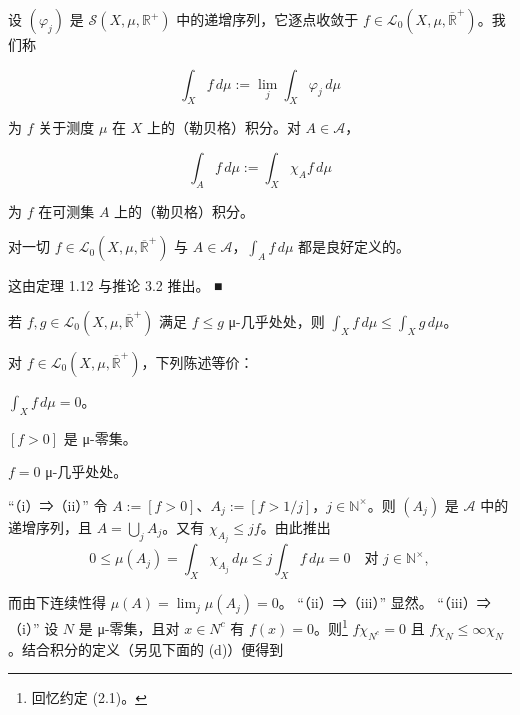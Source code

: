 设 $ (\varphi_j) $ 是 $ \mathcal{S}(X,\mu,\mathbb{R}^+) $ 中的递增序列，它逐点收敛于 $ f \in \mathcal{L}_0(X,\mu,\overline{\mathbb{R}}^+) $。我们称

\[
\int_X f\,d\mu := \lim_j \int_X \varphi_j\,d\mu
\]

为 $ f $ 关于测度 $ \mu $ 在 $ X $ 上的（勒贝格）积分。对 $ A \in \mathcal{A} $，

\[
\int_A f\,d\mu := \int_X \chi_A f\,d\mu
\]

为 $ f $ 在可测集 $ A $ 上的（勒贝格）积分。

\begin{remark}

\begin{items}
\item

对一切 $ f \in \mathcal{L}_0(X,\mu,\overline{\mathbb{R}}^+) $ 与 $ A \in \mathcal{A} $，$ \int_A f\,d\mu $ 都是良好定义的。

\proofhead
这由定理 1.12 与推论 3.2 推出。 \nobreak\hspace{0.35em}■
\item

若 $ f, g \in \mathcal{L}_0(X,\mu,\overline{\mathbb{R}}^+) $ 满足 $ f \le g $ μ-几乎处处，则 $ \int_X f\,d\mu \le \int_X g\,d\mu $。

\item

对 $ f \in \mathcal{L}_0(X,\mu,\overline{\mathbb{R}}^+) $，下列陈述等价：

\begin{subitems}
\item

$ \int_X f\,d\mu = 0 $。

\item

$ [f > 0] $ 是 μ-零集。

\item

$ f = 0 $ μ-几乎处处。

\proofhead
“（i）⇒（ii）” 令 $ A := [f > 0] $、$ A_j := [f > 1/j] $，$ j \in \mathbb{N}^\times $。则 $ (A_j) $ 是 $ \mathcal{A} $ 中的递增序列，且 $ A = \bigcup_j A_j $。又有 $ \chi_{A_j} \le jf $。由此推出
\[
0 \le \mu(A_j) = \int_X \chi_{A_j}\,d\mu \le j \int_X f\,d\mu = 0 \quad \text{对 } j \in \mathbb{N}^\times ,
\]

而由下连续性得 $ \mu(A) = \lim_j \mu(A_j) = 0 $。
“（ii）⇒（iii）” 显然。
“（iii）⇒（i）” 设 $ N $ 是 μ-零集，且对 $ x \in N^c $ 有 $ f(x) = 0 $。则\footnote{回忆约定 (2.1)。} $ f\chi_{N^c} = 0 $ 且 $ f\chi_N \le \infty\chi_N $。结合积分的定义（另见下面的 (d)）便得到


\end{subitems}
\end{items}
\end{remark}

